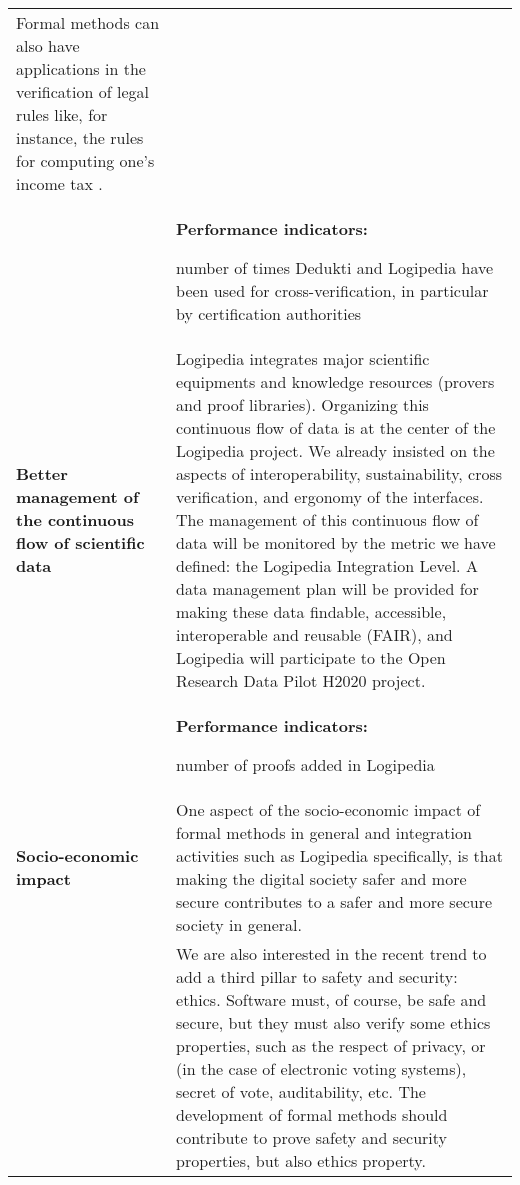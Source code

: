 \begin{longtable}{|p{}|p{}|}
Formal methods can also have applications in the verification of legal
rules like, for instance, the rules for computing one's income tax
\cite{merigoux20jfla}.
\\
&
\colorbox{color2}{\bf Performance indicators:}
\begin{compactitem}
\item number of times Dedukti and Logipedia have been used for 
cross-verification, in particular by certification authorities
\end{compactitem}
\\
\hline
{\bf Better management of the continuous flow of scientific data}
&
Logipedia integrates major scientific equipments and knowledge resources
(provers and proof libraries).
Organizing this continuous flow of data is at the center of the
Logipedia project. We already insisted on the aspects of interoperability,
sustainability, cross verification, and ergonomy of the interfaces. 
The management of this continuous flow of data will be monitored by the 
metric we have defined: the Logipedia Integration Level.
A data management plan will be provided for making these data findable,
accessible, interoperable and reusable (FAIR), and Logipedia will participate
to the Open Research Data Pilot H2020 project.
\\
&
\colorbox{color2}{\bf Performance indicators:}
\begin{compactitem}
\item number of proofs added in Logipedia
\end{compactitem}
\\
\hline
{\bf Socio-economic impact}
&
One aspect of the socio-economic impact of formal methods in general
and integration activities such as Logipedia specifically, is that making the
digital society safer and more secure contributes to a safer and more
secure society in general.\\
&
\hspace{0.4cm} 
We are also interested in the recent trend to add a third pillar to
safety and security: ethics.  Software must, of course, be safe and
secure, but they must also verify some ethics properties, such as
the respect of privacy, or (in the case of electronic voting systems), 
secret of vote, auditability, etc.
The development of formal methods should contribute to prove 
safety and security properties, but also ethics property.
\\

\end{longtable}
